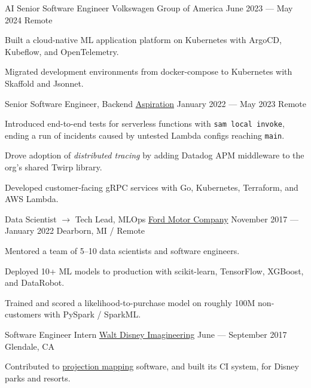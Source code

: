 \documentclass[letterpaper]{resume_config}
\newcommand{\code}[1]{\colorbox{light-gray}{\texttt{#1}}}
\begin{document}
\WorkExperience
    {AI Senior Software Engineer} %
    {Volkswagen Group of America} %
    {June 2023 --- May 2024} %
    {Remote} %
    {
        \item Built a cloud-native ML application platform on Kubernetes with ArgoCD, Kubeflow, and OpenTelemetry.
        \item Migrated development environments from docker-compose to Kubernetes with Skaffold and Jsonnet.
    }

\WorkExperience
    {Senior Software Engineer, Backend} %
    {\href{https://www.aspiration.com/}{Aspiration}} %
    {January 2022 --- May 2023} %
    {Remote} %
    {
        \item Introduced end-to-end tests for serverless functions with \code{sam local invoke}, ending a run of incidents caused by untested Lambda configs reaching \code{main}.
        \item Drove adoption of \textit{distributed tracing} by adding Datadog APM middleware to the org's shared Twirp library.
        \item Developed customer-facing gRPC services with Go, Kubernetes, Terraform, and AWS Lambda.
    }

\WorkExperience
    {Data Scientist $\rightarrow$ Tech Lead, MLOps} %
    {\href{https://www.ford.com/}{Ford Motor Company}} %
    {November 2017 --- January 2022} %
    {Dearborn, MI / Remote} %
    {
        \item Mentored a team of 5--10 data scientists and software engineers.
        \item Deployed 10+ ML models to production with scikit-learn, TensorFlow, XGBoost, and DataRobot.
        \item Trained and scored a likelihood-to-purchase model on roughly 100M non-customers with PySpark / SparkML.
    }

\WorkExperience
    {Software Engineer Intern} %
    {\href{https://sites.disney.com/waltdisneyimagineering/}{Walt Disney Imagineering}} %
    {June --- September 2017} %
    {Glendale, CA} %
    {
        \item Contributed to \href{https://en.wikipedia.org/wiki/Projection_mapping}{projection mapping} software, and built its CI system, for Disney parks and resorts.
    }
\end{document}
